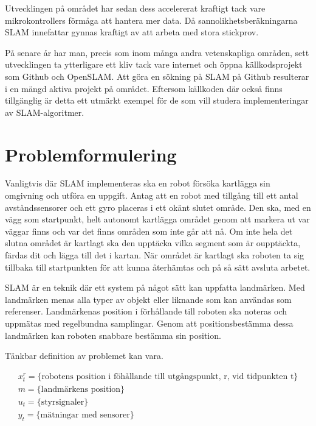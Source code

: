 \documentclass[a4paper,12pt,fleqn]{article}
\begin{document}
Utvecklingen på området har sedan dess accelererat kraftigt tack vare
mikrokontrollers förmåga att hantera mer data. Då sannolikhetsberäkningarna SLAM innefattar gynnas kraftigt av att arbeta med stora stickprov. 

På senare år har man, precis som inom många andra vetenskapliga områden, sett utvecklingen ta ytterligare ett kliv tack vare internet och öppna källkodsprojekt som Github och OpenSLAM. Att göra en sökning på SLAM på Github resulterar i en mängd aktiva projekt på området. Eftersom källkoden där också finns tillgänglig är detta ett utmärkt exempel för de som vill studera implementeringar av SLAM-algoritmer. 


\section{Problemformulering}

Vanligtvis där SLAM implementeras ska en robot försöka kartlägga sin omgivning och utföra en uppgift. Antag att en robot med tillgång till ett antal avståndssensorer och ett gyro placeras i ett okänt slutet område. Den ska, med en vägg som startpunkt, helt autonomt kartlägga området genom att markera ut var väggar finns och var det finns områden som inte går att nå. Om inte hela det slutna området är kartlagt ska den upptäcka vilka segment som är oupptäckta, färdas dit och lägga till det i kartan. När området är kartlagt ska roboten ta sig tillbaka till startpunkten för att kunna återhämtas och på så sätt avsluta arbetet. 

SLAM är en teknik där ett system på något sätt kan uppfatta landmärken. Med landmärken menas alla typer av objekt eller liknande som kan användas som referenser. Landmärkenas position i förhållande till roboten ska noteras och uppmätas med regelbundna samplingar. Genom att positionsbestämma dessa landmärken kan roboten snabbare bestämma sin position. 

Tänkbar definition av problemet kan vara. 

\begin{gather}
x_{t}^r = \{ \text{robotens position i föhållande till utgångspunkt, r, vid tidpunkten t} \} \\
m = \{ \text{landmärkens position} \} \\
u_{t} = \{ \text{styrsignaler} \} \\
y_{t} = \{ \text{mätningar med sensorer} \}
\end{gather}
\end{document}
